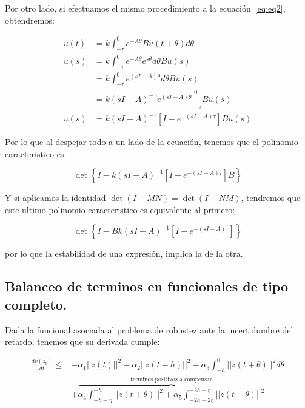         Por otro lado, si efectuamos el mismo procedimiento a la ecuación~\ref{eq:eq2}, obtendremos:

        \begin{align*}
            u(t) &= k \int_{-\tau}^0 e^{-A \theta} B u(t + \theta) d\theta \\
            u(s) &= k \int_{-\tau}^0 e^{-A \theta} e^{s \theta} d\theta B u(s) \\
            &= k \int_{-\tau}^0 e^{(sI-A) \theta} d\theta B u(s) \\
            &= k \left.(sI-A)^{-1} e^{(sI-A) \theta} \right|_{-\tau}^0 B u(s) \\
            u(s) &= k (sI-A)^{-1} \left[ I - e^{-(sI-A) \tau} \right] B u(s)
        \end{align*}

        Por lo que al despejar todo a un lado de la ecuación, tenemos que el polinomio caracteristico es:

        \begin{equation}
            \det{\left\{ I -  k (sI-A)^{-1} \left[ I - e^{-(sI-A) \tau} \right] B \right\}}
        \end{equation}

        Y si aplicamos la identidad $\det{(I - MN)} = \det{(I - NM)}$\cite{kailath1980linear}, tendremos que este ultimo polinomio caracteristico es equivalente al primero:

        \begin{equation}
            \det{\left\{ I -  Bk (sI-A)^{-1} \left[ I - e^{-(sI-A) \tau} \right] \right\}}
        \end{equation}

        por lo que la estabilidad de una expresión, implica la de la otra.

        \subsection*{Balanceo de terminos en funcionales de tipo completo.}

        Dada la funcional asociada al problema de robustez ante la incertidumbre del retardo, tenemos que su derivada cumple:

        \begin{align}
            \frac{d v(z_t)}{dt} \leq& - \alpha_1 \left|\left| z(t) \right|\right|^2 - \alpha_2 \left|\left| z(t - h) \right|\right|^2 - \alpha_3 \int_{-h}^0 \left|\left| z(t + \theta) \right|\right|^2 d\theta \nonumber \\
            &+ \overbrace{\alpha_4 \int_{-h - \eta}^{-h} \left|\left| z(t + \theta) \right|\right|^2 + \alpha_5 \int_{-2h - 2\eta}^{-2h - \eta} \left|\left| z(t + \theta) \right|\right|^2}^{\text{terminos positivos a compensar}}
        \end{align}

